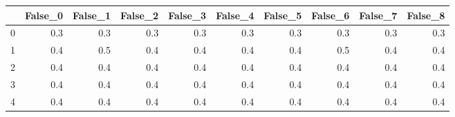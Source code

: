\begin{tabular}{lrrrrrrrrr}
\toprule
{} &  False\_0 &  False\_1 &  False\_2 &  False\_3 &  False\_4 &  False\_5 &  False\_6 &  False\_7 &  False\_8 \\ \hline
\midrule
0 &      0.3 &      0.3 &      0.3 &      0.3 &      0.3 &      0.3 &      0.3 &      0.3 &      0.3 \\ \hline
1 &      0.4 &      0.5 &      0.4 &      0.4 &      0.4 &      0.4 &      0.5 &      0.4 &      0.4 \\ \hline
2 &      0.4 &      0.4 &      0.4 &      0.4 &      0.4 &      0.4 &      0.4 &      0.4 &      0.4 \\ \hline
3 &      0.4 &      0.4 &      0.4 &      0.4 &      0.4 &      0.4 &      0.4 &      0.4 &      0.4 \\ \hline
4 &      0.4 &      0.4 &      0.4 &      0.4 &      0.4 &      0.4 &      0.4 &      0.4 &      0.4 \\ \hline
\bottomrule
\end{tabular}
